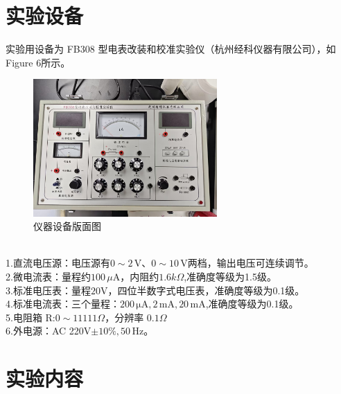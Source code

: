 \documentclass{article}
\begin{document}
\section{实验设备}
\hspace*{2em}实验用设备为 FB308 型电表改装和校准实验仪（杭州经科仪器有限公司），如Figure 6所示。
\begin{figure}[h]
    \centering
    \includegraphics[width=7cm]{2.1.jpg}
    \caption{仪器设备版面图}
\end{figure}
\\
\hspace*{2em}1.直流电压源：电压源有$0 \sim 2\,\mathrm{V}$、$0 \sim 10\, \mathrm{V}$两档，输出电压可连续调节。\\
\hspace*{2em}2.微电流表：量程约$100\, \mu\mathrm{A}$，内阻约$1.6k\Omega$,准确度等级为1.5级。\\
\hspace*{2em}3.标准电压表：量程$20 \mathrm{V}$，四位半数字式电压表，准确度等级为0.1级。\\
\hspace*{2em}4.标准电流表：三个量程：$200 \, \mathrm{\mu A},2 \, \mathrm{mA},20\, \mathrm{mA}$,准确度等级为0.1级。\\
\hspace*{2em}5.电阻箱 R:$0\sim 11111 \Omega$，分辨率 $0.1\Omega$ \\
\hspace*{2em}6.外电源：AC 220V$\pm 10\%,50\,\mathrm{Hz}$。

\section{实验内容}
\end{document}
